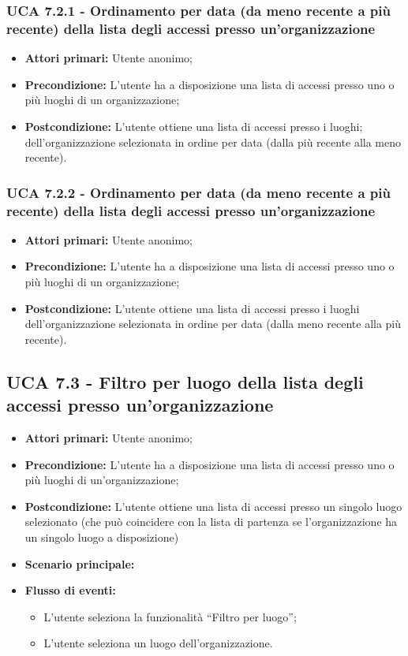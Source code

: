\subsubsection{UCA 7.2.1 - Ordinamento per data (da meno recente a più recente) della lista degli accessi presso un’organizzazione}%
\begin{itemize}
\item \textbf{Attori primari:} Utente anonimo;
\item \textbf{Precondizione:} L’utente ha a disposizione una lista di accessi presso uno o più luoghi di un organizzazione;
\item \textbf{Postcondizione:} L’utente ottiene una lista di accessi presso i luoghi; dell’organizzazione selezionata in ordine per data (dalla più recente alla meno recente).
\end{itemize}

\subsubsection{UCA 7.2.2 - Ordinamento per data (da meno recente a più recente) della lista degli accessi presso un’organizzazione}%
\begin{itemize}
	\item \textbf{Attori primari:} Utente anonimo;
	\item \textbf{Precondizione:} L’utente ha a disposizione una lista di accessi presso uno o più luoghi di un organizzazione;	
	\item \textbf{Postcondizione:} L’utente ottiene una lista di accessi presso i luoghi dell’organizzazione selezionata in ordine per data (dalla meno recente alla più recente).	
\end{itemize}

\subsection{UCA 7.3 - Filtro per luogo della lista degli accessi presso un’organizzazione}%
\begin{itemize}
	\item \textbf{Attori primari:} Utente anonimo;
	\item \textbf{Precondizione:} L’utente ha a disposizione una lista di accessi presso uno o più luoghi di un'organizzazione;
	\item \textbf{Postcondizione:} L’utente ottiene una lista di accessi presso un singolo luogo selezionato (che può coincidere con la lista di partenza se l’organizzazione ha un singolo luogo a disposizione)	
	\item \textbf{Scenario principale:}
	\item \textbf{Flusso di eventi:} 
	\begin{itemize}
		\item L’utente seleziona la funzionalità “Filtro per luogo”;
		\item L’utente seleziona un luogo dell’organizzazione.
	\end{itemize}
\end{itemize}